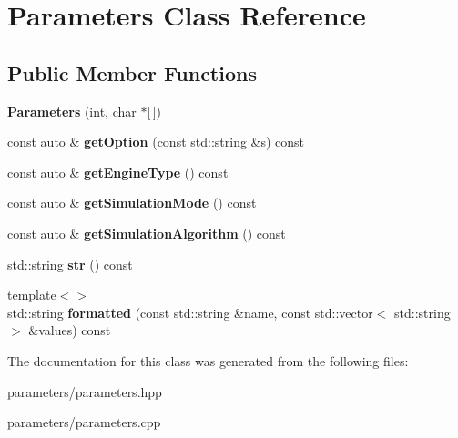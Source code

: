 \hypertarget{classParameters}{}\section{Parameters Class Reference}
\label{classParameters}
\subsection*{Public Member Functions}
\begin{DoxyCompactItemize}
\item 
\mbox{\label{classParameters_a9c0282e8d18dc439e76285fa8201d9fa}} 
{\bfseries Parameters} (int, char $\ast$\mbox{[}$\,$\mbox{]})
\item 
\mbox{\label{classParameters_af21c1953c78336642586e55f6f2fb1c6}} 
const auto \& {\bfseries get\+Option} (const std\+::string \&s) const
\item 
\mbox{\label{classParameters_ad60464f44cc2e44ca371c1bdddac7ee2}} 
const auto \& {\bfseries get\+Engine\+Type} () const
\item 
\mbox{\label{classParameters_a251e6cc559a6bc520ecc49d6eae0e83c}} 
const auto \& {\bfseries get\+Simulation\+Mode} () const
\item 
\mbox{\label{classParameters_ab7aa696880b7d6952faa1756ff378988}} 
const auto \& {\bfseries get\+Simulation\+Algorithm} () const
\item 
\mbox{\label{classParameters_a096a247b3587ee5a98f5f7abe967e537}} 
std\+::string {\bfseries str} () const
\item 
\mbox{\label{classParameters_ad1e257b92912d96e82eb912a8d952dec}} 
{\footnotesize template$<$$>$ }\\std\+::string {\bfseries formatted} (const std\+::string \&name, const std\+::vector$<$ std\+::string $>$ \&values) const
\end{DoxyCompactItemize}


The documentation for this class was generated from the following files\+:\begin{DoxyCompactItemize}
\item 
parameters/parameters.\+hpp\item 
parameters/parameters.\+cpp\end{DoxyCompactItemize}
